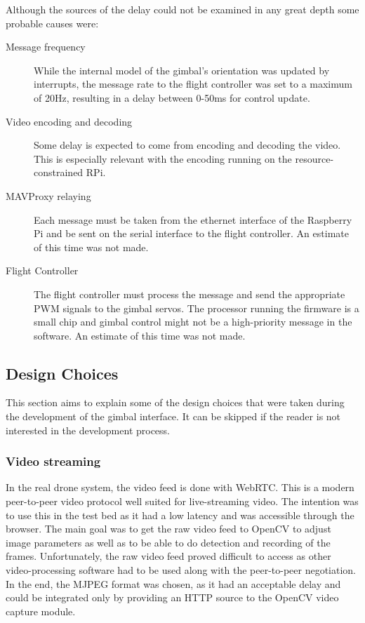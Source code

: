\documentclass[nofilelist]{cslthse-msc}
\begin{document}
Although the sources of the delay could not be examined in any great depth some probable causes were:
\begin{description}
   \item[Message frequency] 
   While the internal model of the gimbal's orientation was updated by interrupts, the message rate to the flight controller was set to a maximum of 20Hz, resulting in a delay between 0-50ms for control update.
   
   \item [Video encoding and decoding]
   Some delay is expected to come from encoding and decoding the video. This is especially relevant with the encoding running on the resource-constrained RPi.  

   \item[MAVProxy relaying] Each message must be taken from the ethernet interface of the Raspberry Pi and be sent on the serial interface to the flight controller. An estimate of this time was not made.
   
   \item[Flight Controller] The flight controller must process the message and send the appropriate PWM signals to the gimbal servos. The processor running the firmware is a small chip and gimbal control might not be a high-priority message in the software. An estimate of this time was not made.
\end{description}

\subsection{Design Choices} 
This section aims to explain some of the design choices that were taken during the development of the gimbal interface. It can be skipped if the reader is not interested in the development process.

\subsubsection{Video streaming}
In the real drone system, the video feed is done with WebRTC. This is a modern peer-to-peer video protocol well suited for live-streaming video. The intention was to use this in the test bed as it had a low latency and was accessible through the browser. The main goal was to get the raw video feed to OpenCV to adjust image parameters as well as to be able to do detection and recording of the frames. Unfortunately, the raw video feed proved difficult to access as other video-processing software had to be used along with the peer-to-peer negotiation. In the end, the MJPEG format was chosen, as it had an acceptable delay and could be integrated only by providing an HTTP source to the OpenCV video capture module.
\end{document}
